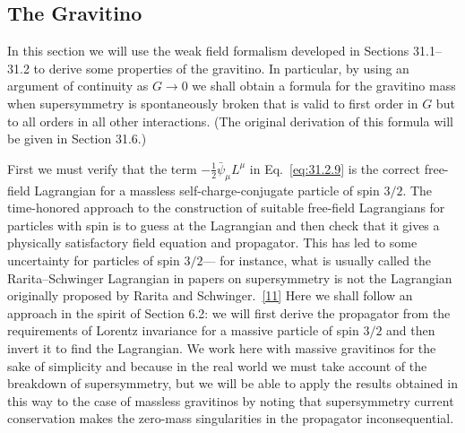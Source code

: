 
\subsection{The Gravitino}

In this section we will use the weak field formalism developed in Sections
31.1--31.2 to derive some properties of the gravitino. In particular, by
using an argument of continuity as \(G\to0\) we shall obtain a formula for
the gravitino mass when supersymmetry is spontaneously broken that is valid
to first order in \(G\) but to all orders in all other interactions. (The
original derivation of this formula will be given in Section 31.6.)

First we must verify that the term
\(-\frac12\bar\psi_\mu L^\mu\) in Eq.~\eqref{eq:31.2.9} is the correct
free-field Lagrangian for a massless self-charge-conjugate particle of spin
\(3/2\). The time-honored approach to the construction of suitable
free-field Lagrangians for particles with spin is to guess at the Lagrangian
and then check that it gives a physically satisfactory field equation and
propagator. This has led to some uncertainty for particles of spin \(3/2\)---
for instance, what is usually called the Rarita--Schwinger Lagrangian in
papers on supersymmetry is not the Lagrangian originally proposed by Rarita
and Schwinger.~\hyperref[ch31-ref-11]{[11]} Here we shall follow an approach
in the spirit of Section 6.2: we will first derive the propagator from the
requirements of Lorentz invariance for a massive particle of spin \(3/2\)
and then invert it to find the Lagrangian. We work here with massive
gravitinos for the sake of simplicity and because in the real world we must
take account of the breakdown of supersymmetry, but we will be able to apply
the results obtained in this way to the case of massless gravitinos by
noting that supersymmetry current conservation makes the zero-mass
singularities in the propagator inconsequential.

